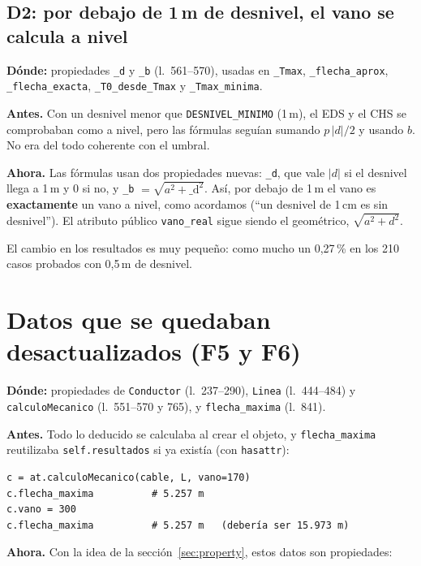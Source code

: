 \documentclass[11pt,a4paper]{article}
\newcommand{\code}[1]{\texttt{#1}}
\newcommand{\antes}[1]{\noindent\textcolor{antes}{\textbf{Antes.}} #1\par\smallskip}
\newcommand{\ahora}[1]{\noindent\textcolor{ahora}{\textbf{Ahora.}} #1\par\smallskip}
\begin{document}
\subsection{D2: por debajo de 1\,m de desnivel, el vano se calcula a nivel}

\noindent\textbf{Dónde:} propiedades \code{\_d} y \code{\_b} (l.~561--570), usadas en \code{\_Tmax}, \code{\_flecha\_aprox}, \code{\_flecha\_exacta}, \code{\_T0\_desde\_Tmax} y \code{\_Tmax\_minima}.\par\medskip

\antes{Con un desnivel menor que \code{DESNIVEL\_MINIMO} (1\,m), el EDS y el CHS se comprobaban como a nivel, pero las fórmulas seguían sumando $p\,|d|/2$ y usando $b$. No era del todo coherente con el umbral.}

\ahora{Las fórmulas usan dos propiedades nuevas: \code{\_d}, que vale $|d|$ si el desnivel llega a 1\,m y 0 si no, y \code{\_b} $=\sqrt{a^2 + \text{\_d}^2}$. Así, por debajo de 1\,m el vano es \textbf{exactamente} un vano a nivel, como acordamos (``un desnivel de 1\,cm es sin desnivel''). El atributo público \code{vano\_real} sigue siendo el geométrico, $\sqrt{a^2+d^2}$.}

El cambio en los resultados es muy pequeño: como mucho un 0,27\,\% en los 210 casos probados con 0,5\,m de desnivel.

\section{Datos que se quedaban desactualizados (F5 y F6)}

\noindent\textbf{Dónde:} propiedades de \code{Conductor} (l.~237--290), \code{Linea} (l.~444--484) y \code{calculoMecanico} (l.~551--570 y 765), y \code{flecha\_maxima} (l.~841).\par\medskip

\antes{Todo lo deducido se calculaba al crear el objeto, y \code{flecha\_maxima} reutilizaba \code{self.resultados} si ya existía (con \code{hasattr}):}

\begin{lstlisting}
c = at.calculoMecanico(cable, L, vano=170)
c.flecha_maxima          # 5.257 m
c.vano = 300
c.flecha_maxima          # 5.257 m   (debería ser 15.973 m)
\end{lstlisting}

\ahora{Con la idea de la sección~\ref{sec:property}, estos datos son propiedades:}
\end{document}
